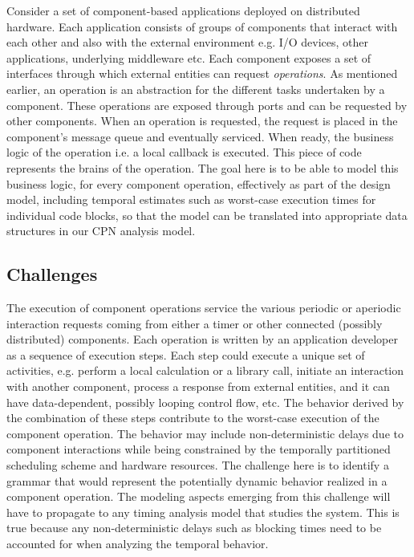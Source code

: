 Consider a set of component-based applications deployed on distributed hardware. Each application consists of groups of components that interact with each other and also with the external environment e.g. I/O devices, other applications, underlying middleware etc. Each component exposes a set of interfaces through which external entities can request \emph{operations}. As mentioned earlier, an operation is an abstraction for the different tasks undertaken by a component. These operations are exposed through ports and can be requested by other components. When an operation is requested, the request is placed in the component's message queue and eventually serviced. When ready, the business logic of the operation i.e. a local callback is executed. This piece of code represents the brains of the operation. The goal here is to be able to model this business logic, for every component operation, effectively as part of the design model, including temporal estimates such as worst-case execution times for individual code blocks, so that the model can be translated into appropriate data structures in our CPN analysis model.

\subsection{Challenges}

The execution of component operations service the various periodic or aperiodic interaction requests coming from either a timer or other connected (possibly distributed) components. Each operation is written by an application developer as a sequence of execution steps. Each step could execute a unique set of activities, e.g. perform a local calculation or a library call, initiate an interaction with another component, process a response from external entities, and it can have data-dependent, possibly looping control flow, etc. The behavior derived by the combination of these steps contribute to the worst-case execution of the component operation. The behavior may include non-deterministic delays due to component interactions while being constrained by the temporally partitioned scheduling scheme and hardware resources. The challenge here is to identify a grammar that would represent the potentially dynamic behavior realized in a component operation. The modeling aspects emerging from this challenge will have to propagate to any timing analysis model that studies the system. This is true because any non-deterministic delays such as blocking times need to be accounted for when analyzing the temporal behavior.

